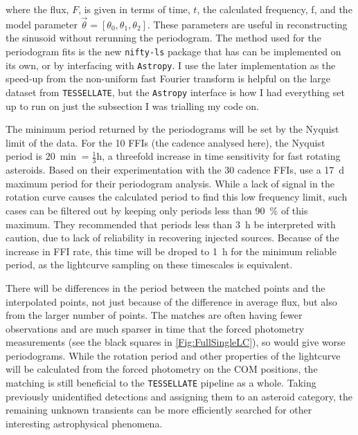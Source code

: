 \documentclass{UCreport}
\begin{document}
where the flux, $F$, is given in terms of time, $t$, the calculated frequency, f, and the model parameter $\vec{\theta} = [\theta_0, \theta_1,\theta_2]$.
These parameters are useful in reconstructing the sinusoid without rerunning the periodogram.
The method used for the periodogram fits is the new \texttt{nifty-ls} package \citep{Garrison2024} that has can be implemented on its own, or by interfacing with \texttt{Astropy}.
I use the later implementation as the speed-up from the non-uniform fast Fourier transform is helpful on the large dataset from \texttt{TESSELLATE}, but the \texttt{Astropy} interface is how I had everything set up to run on just the subsection I was trialling my code on.

The minimum period returned by the periodograms will be set by the Nyquist limit of the data.
For the \qty{10}{\min} FFIs (the cadence analysed here), the Nyquist period is $\qty{20}{\min}=\frac13\unit{\hour}$, a threefold increase in time sensitivity for fast rotating asteroids.
Based on their experimentation with the \qty{30}{\min} cadence FFIs, \citet{McNeill2023} use a \qty{17}{\day} maximum period for their periodogram analysis.
While a lack of signal in the rotation curve causes the calculated period to find this low frequency limit, such cases can be filtered out by keeping only periods less than \qty{90}{\percent} of this maximum.
They recommended that periods less than \qty{3}{\hour} be interpreted with caution, due to lack of reliability in recovering injected sources.
Because of the increase in FFI rate, this time will be droped to \qty{1}{\hour} for the minimum reliable period, as the lightcurve sampling on these timescales is equivalent.

There will be differences in the period between the matched points and the interpolated points, not just because of the difference in average flux, but also from the larger number of points.
The matches are often having fewer observations and are much sparser in time that the forced photometry measurements (see the black squares in \autoref{Fig:FullSingleLC}), so would give worse periodograms.
While the rotation period and other properties of the lightcurve will be calculated from the forced photometry on the COM positions, the matching is still beneficial to the \texttt{TESSELLATE} pipeline as a whole.
Taking previously unidentified detections and assigning them to an asteroid category, the remaining unknown transients can be more efficiently searched for other interesting astrophysical phenomena.
\end{document}
